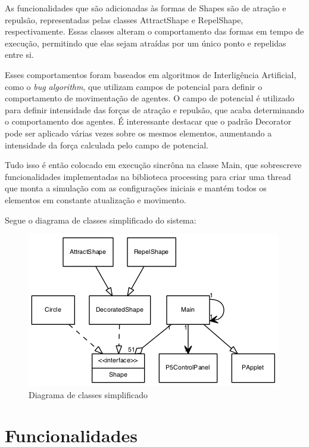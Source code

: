 \documentclass[12pt]{article}
\begin{document}
As funcionalidades que são adicionadas às formas de Shapes são de atração e repulsão, representadas pelas classes AttractShape e RepelShape, respectivamente. Essas classes alteram o comportamento das formas em tempo de execução, permitindo que elas sejam atraídas por um único ponto e repelidas entre si. 

Esses comportamentos foram baseados em algoritmos de Interligência Artificial, como o \textit{bug algorithm}, que utilizam campos de potencial para definir o comportamento de movimentação de agentes. O campo de potencial é utilizado para definir intensidade das forças de atração e repulsão, que acaba determinando o comportamento dos agentes. É interessante destacar que o padrão Decorator pode ser aplicado várias vezes sobre os mesmos elementos, aumentando a intensidade da força calculada pelo campo de potencial.

Tudo isso é então colocado em execução sincrôna na classe Main, que sobrescreve funcionalidades implementadas na biblioteca processing para criar uma thread
que monta a simulação com as configurações iniciais e mantém todos os elementos em constante atualização e movimento.

Segue o diagrama de classes simplificado do sistema:

\begin{figure}[h!]
	\centering
	\includegraphics[width=.8\textwidth]{uml_simple.png}
	\caption{Diagrama de classes simplificado}
	\label{uml}
\end{figure}

\vspace{0.8 true cm}

\section{Funcionalidades}
\label{funcionalidades}
\end{document}
